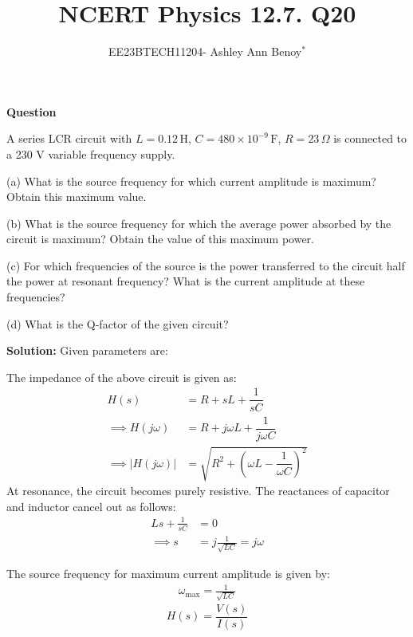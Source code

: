 \documentclass[journal,12pt,twocolumn]{IEEEtran}
\theoremstyle{remark}
\begin{document}

\vspace{3cm}

\title{NCERT Physics 12.7. Q20}
\author{EE23BTECH11204- Ashley Ann Benoy$^{*}$%
}
\maketitle
\newpage
\bigskip

\renewcommand{\thefigure}{\theenumi}
\renewcommand{\thetable}{\theenumi}



\textbf{Question}

A series LCR circuit with 
\(L = 0.12 \, \text{H}\),
\(C = 480 \times 10^{-9} \, \text{F}\), 
\(R=23 \, \Omega\)
is connected to a 230 V variable frequency supply.

(a) What is the source frequency for which current amplitude is maximum? Obtain this maximum value.

(b) What is the source frequency for which the average power absorbed by the circuit is maximum? Obtain the value of this maximum power.

(c) For which frequencies of the source is the power transferred to the circuit half the power at resonant frequency? What is the current amplitude at these frequencies?

(d) What is the Q-factor of the given circuit?

\textbf{Solution:}
Given parameters are:




The impedance of the above circuit is given as:
\begin{align}
     H(s) &= R + sL + \dfrac{1}{sC}\\
     \implies H(j\omega) &= R + j\omega L + \dfrac{1}{j\omega C}\\
     \implies \lvert H(j\omega) \rvert &= \sqrt{R^2 + \left(\omega L - \dfrac{1}{\omega C}\right)^2}
\end{align}
 At resonance, the circuit becomes purely resistive. The reactances of capacitor and inductor cancel out as follows:
\begin{align}
    Ls + \frac{1}{sC} &= 0 \\
    \implies s &= j\frac{1}{\sqrt{LC}} = j\omega
\end{align}

The source frequency for maximum current amplitude is given by:
\begin{align}
    \omega_{\text{max}} = \frac{1}{\sqrt{LC}}
    \label{eq:omega_max}
\end{align}
\begin{equation}
    H(s) = \dfrac{V(s)}{I(s)}
\end{equation}
\end{document}
